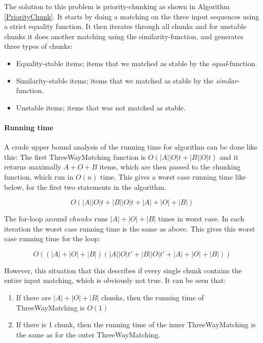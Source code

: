 \documentclass[11pt]{article}
\begin{document}
The solution to this problem is priority-chunking as shown in Algorithm \ref{PriorityChunk}. It starts by doing a matching on the three input sequences using a strict equality function. It then iterates through all chunks and for unstable chunks it does another matching using the similarity-function, and generates three types of chunks:

\begin{itemize}
   \item Equality-stable items; items that we matched as stable by the \textit{equal}-function.
   \item Similarity-stable items; items that we matched as stable by the \textit{similar}-function.
   \item Unstable items; items that was not matched as stable.
\end{itemize}


\paragraph{Running time} A crude upper bound analysis of the running time for algorithm can be done like this: The first ThreeWayMatching function is  $O(|A||O|t + |B||O|t)$ and it returns maximally $A+O+B$ items, which are then passed to the chunking function, which run in $O(n)$ time. This gives a worst case running time like below, for the first two statements in the algorithm.

\begin{equation}
O(|A||O|t + |B||O|t + |A|+|O|+|B|) \nonumber
\end{equation}

The for-loop around $chunks$ runs $|A|+|O|+|B|$ times in worst case. In each iteration the worst case running time is the same as above. This gives this worst case running time for the loop:

\begin{equation}
O((|A| + |O| + |B|) (|A||O|t' + |B||O|t' + |A|+|O|+|B|)) \nonumber
\end{equation}

However, this situation that this describes if every single chunk contains the entire input matching, which is obviously not true. It can be seen that:

\begin{enumerate}
\item If there are $|A|+|O|+|B|$ chunks, then the running time of ThreeWayMatching is $O(1)$
\item If there is 1 chunk, then the running time of the inner ThreeWayMatching is the same as for the outer ThreeWayMatching.
\end{enumerate}
\end{document}
